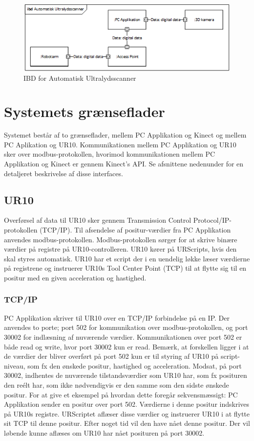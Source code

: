 \begin{figure}[H]
    \centering
    \includegraphics[width=1\textwidth]{figurer/d/Design/IBD}
    \caption{IBD for Automatisk Ultralydsscanner}
    \label{IBD}
\end{figure}

\section{Systemets grænseflader}
Systemet består af to grænseflader, mellem PC Applikation og Kinect og mellem PC Aplikation og UR10. Kommunikationen mellem PC Applikation og UR10 sker over modbus-protokollen, hvorimod kommunikationen mellem PC Applikation og Kinect er gennem Kinect's API.
Se afsnittene nedenunder for en detaljeret beskrivelse af disse interfaces.

\subsection{UR10}
Overførsel af data til UR10 sker gennem Transmission Control Protocol/IP-protokollen (TCP/IP). Til afsendelse af positur-værdier fra PC Applikation anvendes modbus-protokollen. Modbus-protokollen sørger for at skrive binære værdier på registre på UR10-controlleren. UR10 kører på URScripts, hvis den skal styres automatisk. UR10 har et script der i en uendelig løkke læser værdierne på registrene og instruerer UR10s Tool Center Point (TCP) til at flytte sig til en positur med en given acceleration og hastighed.

\subsubsection{TCP/IP}
PC Applikation skriver til UR10 over en TCP/IP forbindelse på en IP. Der anvendes to porte; port 502 for kommunikation over modbus-protokollen, og port 30002 for indlæsning af nuværende værdier.
Kommunikationen over port 502 er både read og write, hvor port 30002 kun er read. 
Bemærk, at forskellen  ligger i at de værdier der bliver overført på port 502 kun er til styring af UR10 på script-niveau, som fx den ønskede positur, hastighed og acceleration. Modsat, på port 30002, indhentes de nuværende tilstandsværdier som UR10 har, som fx posituren den reélt har, som ikke nødvendigvis er den samme som den sidste ønskede positur.
For at give et eksempel på hvordan dette foregår sekvensmæssigt:
PC Applikation sender en positur over port 502. Værdierne i denne positur indskrives på UR10s registre.
URScriptet aflæser disse værdier og instruerer UR10 i at flytte sit TCP til denne positur.
Efter noget tid vil den have nået denne positur. Der vil løbende kunne aflæses om UR10 har nået posituren på port 30002.

